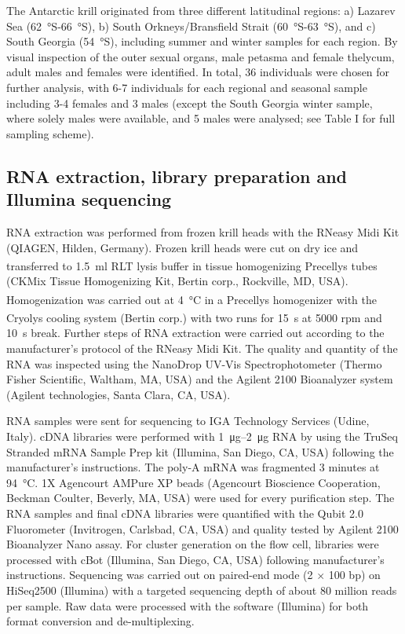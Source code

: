 The Antarctic krill originated from three different latitudinal regions:
a) Lazarev Sea (\SI{62}{\degree}S-\SI{66}{\degree}S), b) South
Orkneys/Bransfield Strait (\SI{60}{\degree}S-\SI{63}{\degree}S), and c) South
Georgia (\SI{54}{\degree}S), including summer and winter samples for each region.
By visual inspection of the outer sexual organs, male petasma and female
thelycum, adult males and females were identified. In total, 36 individuals
were chosen for further analysis, with 6-7 individuals for each regional and
seasonal sample including 3-4 females and 3 males (except the South Georgia
winter sample, where solely males were available, and 5 males were analysed;
see Table I for full sampling scheme).

\subsection*{RNA extraction, library preparation and Illumina sequencing}

RNA extraction was performed from frozen krill heads with the RNeasy Midi Kit
(QIAGEN, Hilden, Germany). Frozen krill heads were cut on dry ice and
transferred to \SI{1.5}{\milli\litre} RLT lysis buffer in tissue homogenizing
Precellys\textsuperscript{\textregistered} tubes (CKMix Tissue Homogenizing
Kit, Bertin corp., Rockville, MD, USA).  Homogenization was carried out at
\SI{4}{\celsius} in a Precellys\textsuperscript{\textregistered} homogenizer
with the Cryolys\textsuperscript{\textregistered} cooling system (Bertin corp.)
with two runs for \SI{15}{\second} at 5000 rpm and \SI{10}{\second} break.
Further steps of RNA extraction were carried out according to the
manufacturer's protocol of the RNeasy Midi Kit. The quality and quantity of the
RNA was inspected using the NanoDrop UV-Vis Spectrophotometer
(Thermo Fisher Scientific, Waltham, MA, USA) and the Agilent 2100 Bioanalyzer
system (Agilent technologies, Santa Clara, CA, USA).

RNA samples were sent for sequencing to IGA Technology Services (Udine, Italy).
cDNA libraries were performed with \SIrange{1}{2}{\micro\gram} RNA by using the
TruSeq Stranded mRNA Sample Prep kit (Illumina, San Diego, CA, USA) following
the manufacturer's instructions. The poly-A mRNA was fragmented 3 minutes at
\SI{94}{\celsius}. 1X Agencourt AMPure XP beads (Agencourt Bioscience Cooperation,
Beckman Coulter, Beverly, MA, USA) were used for every purification step. The
RNA samples and final cDNA libraries were quantified with the Qubit 2.0
Fluorometer (Invitrogen, Carlsbad, CA, USA) and quality tested by Agilent 2100
Bioanalyzer Nano assay.  For cluster generation on the flow cell, libraries
were processed with cBot (Illumina, San Diego, CA, USA) following
manufacturer's instructions.  Sequencing was carried out on paired-end mode
(2 $\times$ 100 bp) on HiSeq2500 (Illumina) with a targeted sequencing depth of about 80
million reads per sample. Raw data were processed with the software  (Illumina) for both format conversion and de-multiplexing.

